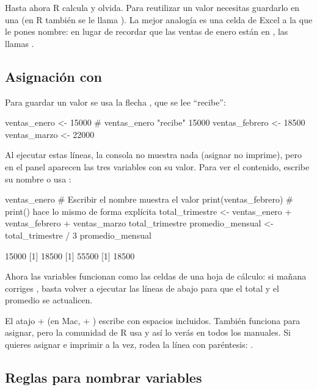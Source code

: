 Hasta ahora R calcula y olvida. Para reutilizar un valor necesitas guardarlo
en una  (en R también se le llama ). La
mejor analogía es una celda de Excel a la que le pones nombre: en lugar de
recordar que las ventas de enero están en , las llamas
.

\subsection{Asignación con \texorpdfstring{\codigo{<-}}{<-}}

Para guardar un valor se usa la flecha \codigo{<-}, que se lee ``recibe'':

\begin{rcode}
ventas_enero <- 15000      # ventas_enero "recibe" 15000
ventas_febrero <- 18500
ventas_marzo <- 22000
\end{rcode}

Al ejecutar estas líneas, la consola no muestra nada (asignar no imprime),
pero en el panel  aparecen las tres variables con su valor.
Para ver el contenido, escribe su nombre o usa :

\begin{rcode}
ventas_enero                 # Escribir el nombre muestra el valor
print(ventas_febrero)        # print() hace lo mismo de forma explícita
total_trimestre <- ventas_enero + ventas_febrero + ventas_marzo
total_trimestre
promedio_mensual <- total_trimestre / 3
promedio_mensual
\end{rcode}
\begin{rsalida}
[1] 15000
[1] 18500
[1] 55500
[1] 18500
\end{rsalida}

Ahora las variables funcionan como las celdas de una hoja de cálculo: si
mañana corriges , basta volver a ejecutar las líneas
de abajo para que el total y el promedio se actualicen.

\begin{consejo}
El atajo  + \tecla{-} (en Mac,  + \tecla{-})
escribe \codigo{<-} con espacios incluidos. También funciona \codigo{=} para
asignar, pero la comunidad de R usa \codigo{<-} y así lo verás en todos los
manuales. Si quieres asignar e imprimir a la vez, rodea la línea con
paréntesis: .
\end{consejo}

\subsection{Reglas para nombrar variables}


